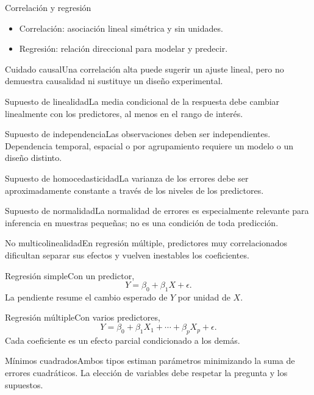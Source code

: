 \documentclass[10pt,aspectratio=169]{beamer}
\begin{document}
\begin{frame}{Correlación y regresión}\small\begin{itemize}\item Correlación: asociación lineal simétrica y sin unidades.\item Regresión: relación direccional para modelar y predecir.\end{itemize}\end{frame}
\begin{frame}{Cuidado causal}\small Una correlación alta puede sugerir un ajuste lineal, pero no demuestra causalidad ni sustituye un diseño experimental.\end{frame}
\begin{frame}{Supuesto de linealidad}\small La media condicional de la respuesta debe cambiar linealmente con los predictores, al menos en el rango de interés.\end{frame}
\begin{frame}{Supuesto de independencia}\small Las observaciones deben ser independientes. Dependencia temporal, espacial o por agrupamiento requiere un modelo o un diseño distinto.\end{frame}
\begin{frame}{Supuesto de homocedasticidad}\small La varianza de los errores debe ser aproximadamente constante a través de los niveles de los predictores.\end{frame}
\begin{frame}{Supuesto de normalidad}\small La normalidad de errores es especialmente relevante para inferencia en muestras pequeñas; no es una condición de toda predicción.\end{frame}
\begin{frame}{No multicolinealidad}\small En regresión múltiple, predictores muy correlacionados dificultan separar sus efectos y vuelven inestables los coeficientes.\end{frame}
\begin{frame}{Regresión simple}\small Con un predictor,\[Y=\beta_0+\beta_1X+\epsilon.\]La pendiente resume el cambio esperado de $Y$ por unidad de $X$.\end{frame}
\begin{frame}{Regresión múltiple}\small Con varios predictores,\[Y=\beta_0+\beta_1X_1+\cdots+\beta_pX_p+\epsilon.\]Cada coeficiente es un efecto parcial condicionado a los demás.\end{frame}
\begin{frame}{Mínimos cuadrados}\small Ambos tipos estiman parámetros minimizando la suma de errores cuadráticos. La elección de variables debe respetar la pregunta y los supuestos.\end{frame}
\end{document}
